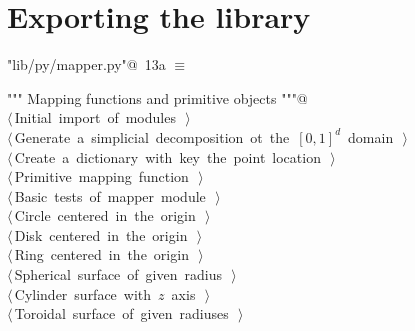 \documentclass[11pt,oneside]{article}	%
\begin{document}
\section{Exporting the library}
\begin{flushleft} \small \label{scrap29}
\protect{}\verb@"lib/py/mapper.py"@\nobreak\ {\footnotesize 13a }$\equiv$
\vspace{-1ex}
\begin{list}{}{} \item
\mbox{}\verb@""" Mapping functions and primitive objects """@\\
\mbox{}\verb@@\hbox{$\langle\,$Initial import of modules\nobreak\ {\footnotesize {}}$\,\rangle$}\verb@@\\
\mbox{}\verb@@\hbox{$\langle\,$Generate a simplicial decomposition ot the $[0,1]^d$ domain\nobreak\ {\footnotesize {}}$\,\rangle$}\verb@@\\
\mbox{}\verb@@\hbox{$\langle\,$Create a dictionary with key the point location\nobreak\ {\footnotesize {}}$\,\rangle$}\verb@@\\
\mbox{}\verb@@\hbox{$\langle\,$Primitive mapping function\nobreak\ {\footnotesize {}}$\,\rangle$}\verb@@\\
\mbox{}\verb@@\hbox{$\langle\,$Basic tests of mapper module\nobreak\ {\footnotesize {}}$\,\rangle$}\verb@@\\
\mbox{}\verb@@\hbox{$\langle\,$Circle centered in the origin\nobreak\ {\footnotesize {}}$\,\rangle$}\verb@@\\
\mbox{}\verb@@\hbox{$\langle\,$Disk centered in the origin\nobreak\ {\footnotesize {}}$\,\rangle$}\verb@@\\
\mbox{}\verb@@\hbox{$\langle\,$Ring centered in the origin\nobreak\ {\footnotesize {}}$\,\rangle$}\verb@@\\
\mbox{}\verb@@\hbox{$\langle\,$Spherical surface of given radius\nobreak\ {\footnotesize {}}$\,\rangle$}\verb@@\\
\mbox{}\verb@@\hbox{$\langle\,$Cylinder surface with $z$ axis\nobreak\ {\footnotesize {}}$\,\rangle$}\verb@@\\
\mbox{}\verb@@\hbox{$\langle\,$Toroidal surface of given radiuses\nobreak\ {\footnotesize {}}$\,\rangle$}\verb@@\\

\end{list}
\end{flushleft}
\end{document}
